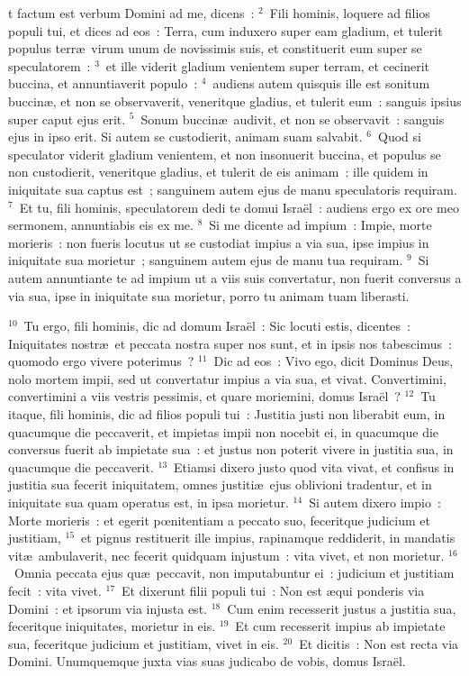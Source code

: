 \bchapter
{}t factum est verbum Domini ad me, dicens~:
${}^{2}$~Fili hominis, loquere ad filios populi tui, et dices ad eos~: Terra, cum induxero super eam gladium, et tulerit populus terr\ae\ virum unum de novissimis suis, et constituerit eum super se speculatorem~:
${}^{3}$~et ille viderit gladium venientem super terram, et cecinerit buccina, et annuntiaverit populo~:
${}^{4}$~audiens autem quisquis ille est sonitum buccin\ae , et non se observaverit, veneritque gladius, et tulerit eum~: sanguis ipsius super caput ejus erit.
${}^{5}$~Sonum buccin\ae\ audivit, et non se observavit~: sanguis ejus in ipso erit. Si autem se custodierit, animam suam salvabit.
${}^{6}$~Quod si speculator viderit gladium venientem, et non insonuerit buccina, et populus se non custodierit, veneritque gladius, et tulerit de eis animam~: ille quidem in iniquitate sua captus est~; sanguinem autem ejus de manu speculatoris requiram.
${}^{7}$~Et tu, fili hominis, speculatorem dedi te domui Isra\"el~: audiens ergo ex ore meo sermonem, annuntiabis eis ex me.
${}^{8}$~Si me dicente ad impium~: Impie, morte morieris~: non fueris locutus ut se custodiat impius a via sua, ipse impius in iniquitate sua morietur~; sanguinem autem ejus de manu tua requiram.
${}^{9}$~Si autem annuntiante te ad impium ut a viis suis convertatur, non fuerit conversus a via sua, ipse in iniquitate sua morietur, porro tu animam tuam liberasti.


${}^{10}$~Tu ergo, fili hominis, dic ad domum Isra\"el~: Sic locuti estis, dicentes~: Iniquitates nostr\ae\ et peccata nostra super nos sunt, et in ipsis nos tabescimus~: quomodo ergo vivere poterimus~?
${}^{11}$~Dic ad eos~: Vivo ego, dicit Dominus Deus, nolo mortem impii, sed ut convertatur impius a via sua, et vivat. Convertimini, convertimini a viis vestris pessimis, et quare moriemini, domus Isra\"el~?
${}^{12}$~Tu itaque, fili hominis, dic ad filios populi tui~: Justitia justi non liberabit eum, in quacumque die peccaverit, et impietas impii non nocebit ei, in quacumque die conversus fuerit ab impietate sua~: et justus non poterit vivere in justitia sua, in quacumque die peccaverit.
${}^{13}$~Etiamsi dixero justo quod vita vivat, et confisus in justitia sua fecerit iniquitatem, omnes justiti\ae\ ejus oblivioni tradentur, et in iniquitate sua quam operatus est, in ipsa morietur.
${}^{14}$~Si autem dixero impio~: Morte morieris~: et egerit pœnitentiam a peccato suo, feceritque judicium et justitiam,
${}^{15}$~et pignus restituerit ille impius, rapinamque reddiderit, in mandatis vit\ae\ ambulaverit, nec fecerit quidquam injustum~: vita vivet, et non morietur.
${}^{16}$~Omnia peccata ejus qu\ae\ peccavit, non imputabuntur ei~: judicium et justitiam fecit~: vita vivet.
${}^{17}$~Et dixerunt filii populi tui~: Non est \ae qui ponderis via Domini~: et ipsorum via injusta est.
${}^{18}$~Cum enim recesserit justus a justitia sua, feceritque iniquitates, morietur in eis.
${}^{19}$~Et cum recesserit impius ab impietate sua, feceritque judicium et justitiam, vivet in eis.
${}^{20}$~Et dicitis~: Non est recta via Domini. Unumquemque juxta vias suas judicabo de vobis, domus Isra\"el.



